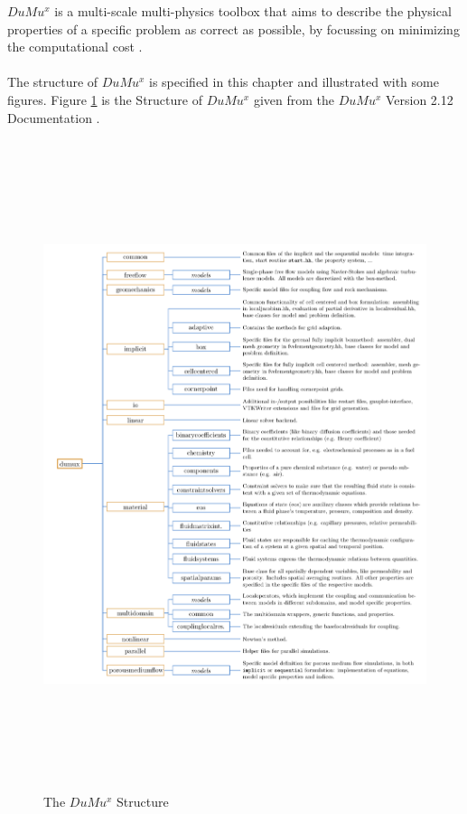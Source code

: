 $DuMu^x$ is a multi-scale multi-physics toolbox that aims to describe the physical properties of a specific problem as correct as possible, by focussing on minimizing the computational cost \cite{flemisch2007dumux}.\\
\\The structure of $DuMu^x$ is specified in this chapter and illustrated with some figures.
Figure \ref{fig:dumux_structure}  is the Structure of $DuMu^x$ given from the $DuMu^x$ Version 2.12 Documentation \cite{flemischdumux}.\\
\begin{figure}[p]
\centering
\includegraphics[height=190mm]{dumux_structure}
\caption{\footnotesize The $DuMu^x$ Structure}
\label{fig:dumux_structure}
\end{figure}\\\\\\\\\\\\\\\\\\\\

